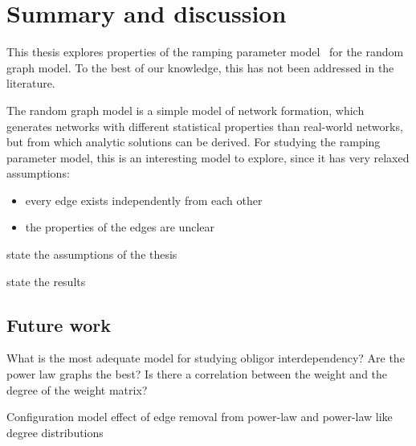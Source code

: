 \chapter{Summary and discussion} %
\label{cha:discussion}

This thesis explores properties of the ramping parameter model~\cite{Sindel:2009} for the random graph model.
To the best of our knowledge, this has not been addressed in the literature.



The random graph model is a simple model of network formation, which generates networks with different statistical properties than real-world networks, but from which analytic solutions can be derived.
For studying the ramping parameter model, this is an interesting model to explore, since it has very relaxed assumptions:
\begin{itemize}
\item every edge exists independently from each other
\item the properties of the edges are unclear
\end{itemize}




state the assumptions of the thesis

state the results


\section{Future work}
\label{sec:future_work}

What is the most adequate model for studying obligor interdependency?
Are the power law graphs the best?
Is there a correlation between the weight and the degree of the weight matrix?


Configuration model
effect of edge removal from power-law and power-law like degree distributions~\cite{dubois2012effect}





